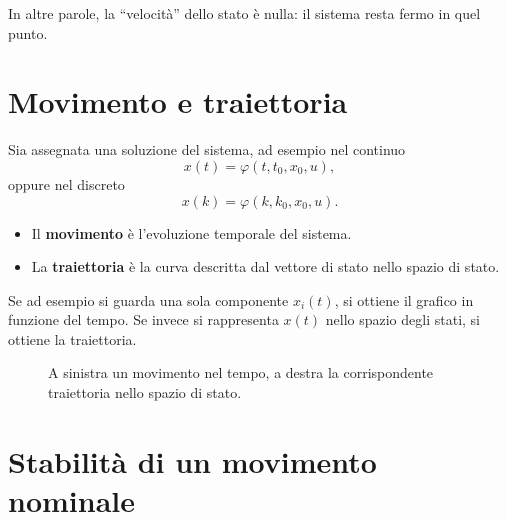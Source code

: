 In altre parole, la ``velocità'' dello stato è nulla: il sistema resta fermo in quel punto.

\bigskip

\section{Movimento e traiettoria}

Sia assegnata una soluzione del sistema, ad esempio nel continuo
\[
x(t)=\varphi(t,t_0,x_0,u),
\]
oppure nel discreto
\[
x(k)=\varphi(k,k_0,x_0,u).
\]

\begin{itemize}
    \item Il \textbf{movimento} è l'evoluzione temporale del sistema.
    \item La \textbf{traiettoria} è la curva descritta dal vettore di stato nello spazio di stato.
\end{itemize}

Se ad esempio si guarda una sola componente \(x_i(t)\), si ottiene il grafico in funzione del tempo. Se invece si rappresenta \(x(t)\) nello spazio degli stati, si ottiene la traiettoria.

\begin{figure}[h!]
\centering
{}
\caption{A sinistra un movimento nel tempo, a destra la corrispondente traiettoria nello spazio di stato.}
\end{figure}

\bigskip

\section{Stabilità di un movimento nominale}

